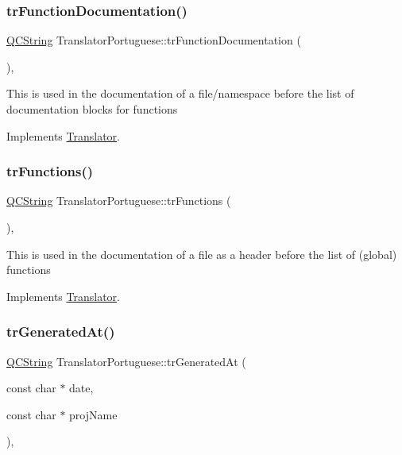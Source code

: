 \subsubsection{\texorpdfstring{trFunctionDocumentation()}{trFunctionDocumentation()}}
{\footnotesize\ttfamily \mbox{\hyperlink{class_q_c_string}{Q\+C\+String}} Translator\+Portuguese\+::tr\+Function\+Documentation (\begin{DoxyParamCaption}{ }\end{DoxyParamCaption})\hspace{0.3cm}{\ttfamily [inline]}, {\ttfamily [virtual]}}

This is used in the documentation of a file/namespace before the list of documentation blocks for functions 

Implements \mbox{\hyperlink{class_translator}{Translator}}.

\mbox{\label{class_translator_portuguese_a8699679f6ed09ba4517c609689a4f6df}} 
\subsubsection{\texorpdfstring{trFunctions()}{trFunctions()}}
{\footnotesize\ttfamily \mbox{\hyperlink{class_q_c_string}{Q\+C\+String}} Translator\+Portuguese\+::tr\+Functions (\begin{DoxyParamCaption}{ }\end{DoxyParamCaption})\hspace{0.3cm}{\ttfamily [inline]}, {\ttfamily [virtual]}}

This is used in the documentation of a file as a header before the list of (global) functions 

Implements \mbox{\hyperlink{class_translator}{Translator}}.

\mbox{\label{class_translator_portuguese_a693f9bfd3274ee9d4213cf04bf20192c}} 
\subsubsection{\texorpdfstring{trGeneratedAt()}{trGeneratedAt()}}
{\footnotesize\ttfamily \mbox{\hyperlink{class_q_c_string}{Q\+C\+String}} Translator\+Portuguese\+::tr\+Generated\+At (\begin{DoxyParamCaption}\item[{const char $\ast$}]{date,  }\item[{const char $\ast$}]{proj\+Name }\end{DoxyParamCaption})\hspace{0.3cm}{\ttfamily [inline]}, {\ttfamily [virtual]}}


